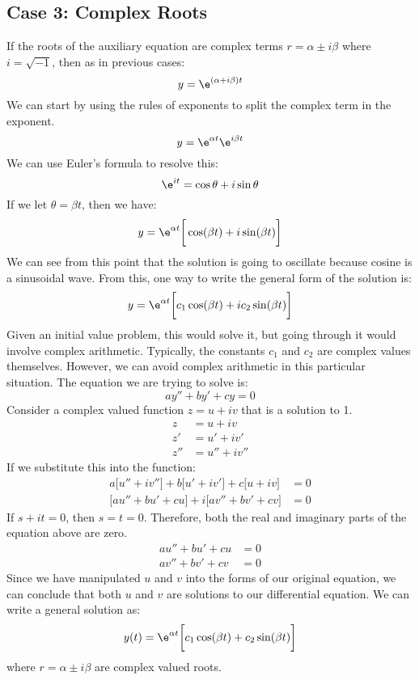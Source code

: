 \documentclass{math}
\begin{document}
\subsection*{Case 3: Complex Roots}
If the roots of the auxiliary equation are complex terms \( r = \alpha\pm
i\beta \) where \( i = \sqrt{-1} \), then as in previous cases:
\[ y = \e^{(\alpha+i\beta)t} \]
We can start by using the rules of exponents to split the complex term in the
exponent.
\[ y = \e^{\alpha t}\e^{i\beta t} \]
We can use Euler's formula to resolve this:
\[ \e^{it} = \cos\theta+i\sin\theta \]
If we let \( \theta = \beta t \), then we have:
\[ y = \e^{\alpha t}\bigg[\cos(\beta t)+i\sin(\beta t)\bigg] \]
We can see from this point that the solution is going to oscillate because
cosine is a sinusoidal wave. From this, one way to write the general form of
the solution is:
\[ y = \e^{\alpha t}\bigg[c_1\cos(\beta t)+ic_2\sin(\beta t)\bigg] \]
Given an initial value problem, this would solve it, but going through it would
involve complex arithmetic. Typically, the constants \( c_1 \) and \( c_2 \) are
complex values themselves. However, we can avoid complex arithmetic in this
particular situation. The equation we are trying to solve is:
\[ ay''+by'+cy = 0 \]
Consider a complex valued function \( z = u+iv \) that is a solution to 1.
\begin{align*}
  z &= u+iv \\
  z' &= u'+iv' \\
  z'' &= u''+iv''
\end{align*}
If we substitute this into the function:
\begin{align*}
  a\bigg[u''+iv''\bigg]+b\bigg[u'+iv'\bigg]+c\bigg[u+iv\bigg] &= 0 \\
  \bigg[au''+bu'+cu\bigg]+i\bigg[av''+bv'+cv\bigg] &= 0
\end{align*}
If \( s+it = 0 \), then \( s = t = 0 \). Therefore, both the real and imaginary
parts of the equation above are zero.
\begin{align*}
  au''+bu'+cu &= 0 \\
  av''+bv'+cv &= 0
\end{align*}
Since we have manipulated \( u \) and \( v \) into the forms of our original
equation, we can conclude that both \( u \) and \( v \) are solutions to our
differential equation. We can write a general solution as:
\[ y(t) = \e^{\alpha t}\bigg[c_1\cos(\beta t)+c_2\sin(\beta t)\bigg] \]
where \( r = \alpha\pm i\beta \) are complex valued roots.
\end{document}
